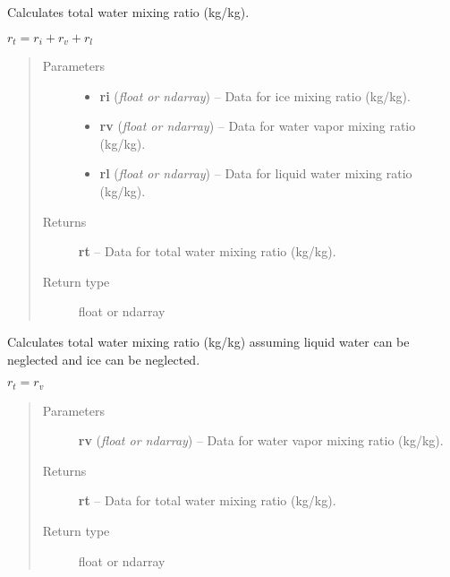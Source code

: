 \documentclass[letterpaper,10pt,english]{sphinxmanual}
\begin{document}
\begin{fulllineitems}
\label{atmos:atmos.equations.rt_from_ri_rv_rl}
Calculates total water mixing ratio (kg/kg).

\(r_t = r_i+r_v+r_l\)
\begin{quote}\begin{description}
\item[{Parameters}] \leavevmode\begin{itemize}
\item {} 
\textbf{ri} (\emph{float or ndarray}) -- Data for ice mixing ratio (kg/kg).

\item {} 
\textbf{rv} (\emph{float or ndarray}) -- Data for water vapor mixing ratio (kg/kg).

\item {} 
\textbf{rl} (\emph{float or ndarray}) -- Data for liquid water mixing ratio (kg/kg).

\end{itemize}

\item[{Returns}] \leavevmode
\textbf{rt} --
Data for total water mixing ratio (kg/kg).

\item[{Return type}] \leavevmode
float or ndarray

\end{description}\end{quote}

\end{fulllineitems}


\begin{fulllineitems}
\label{atmos:atmos.equations.rt_from_rv}
Calculates total water mixing ratio (kg/kg) assuming liquid water can be
neglected and ice can be neglected.

\(r_t = r_v\)
\begin{quote}\begin{description}
\item[{Parameters}] \leavevmode
\textbf{rv} (\emph{float or ndarray}) -- Data for water vapor mixing ratio (kg/kg).

\item[{Returns}] \leavevmode
\textbf{rt} --
Data for total water mixing ratio (kg/kg).

\item[{Return type}] \leavevmode
float or ndarray

\end{description}\end{quote}

\end{fulllineitems}
\end{document}
